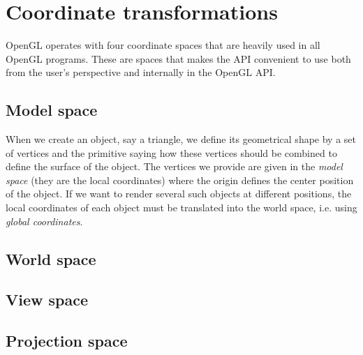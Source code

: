 \section{Coordinate transformations}
\label{sec:opengl_coordinate_transformations}
OpenGL operates with four coordinate spaces that are heavily used in all OpenGL programs. These are spaces that makes the API convenient to use both from the user's perspective and internally in the OpenGL API. 
\subsection{Model space}
When we create an object, say a triangle, we define its geometrical shape by a set of vertices and the primitive saying how these vertices should be combined to define the surface of the object. The vertices we provide are given in the \textit{model space} (they are the local coordinates) where the origin defines the center position of the object. If we want to render several such objects at different positions, the local coordinates of each object must be translated into the world space, i.e. using \textit{global coordinates}.
\subsection{World space}

\subsection{View space}

\subsection{Projection space}